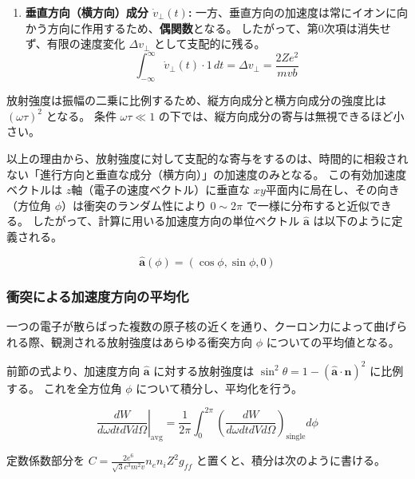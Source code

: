 \documentclass[a4paper,11pt]{bxjsarticle} %
\begin{document}
\begin{enumerate}
\begin{enumerate}
        \item \textbf{垂直方向（横方向）成分 $\dot{v}_{\perp}(t)$:} 
        一方、垂直方向の加速度は常にイオンに向かう方向に作用するため、\textbf{偶関数}となる。
        したがって、第0次項は消失せず、有限の速度変化 $\Delta v_{\perp}$ として支配的に残る。
        \begin{equation}
            \int_{-\infty}^{\infty} \dot{v}_{\perp}(t) \cdot 1 \, dt = \Delta v_{\perp} = \frac{2Ze^2}{mvb}
        \end{equation}
    \end{enumerate}

    放射強度は振幅の二乗に比例するため、縦方向成分と横方向成分の強度比は $(\omega \tau)^2$ となる。
    条件 $\omega \tau \ll 1$ の下では、縦方向成分の寄与は無視できるほど小さい。

    以上の理由から、放射強度に対して支配的な寄与をするのは、時間的に相殺されない「進行方向と垂直な成分（横方向）」の加速度のみとなる。
    この有効加速度ベクトルは $z$軸（電子の速度ベクトル）に垂直な $xy$平面内に局在し、その向き（方位角 $\phi$）は衝突のランダム性により $0 \sim 2\pi$ で一様に分布すると近似できる。
    したがって、計算に用いる加速度方向の単位ベクトル $\hat{\bm{a}}$ は以下のように定義される。

    \begin{equation}
        \hat{\bm{a}}(\phi) = (\cos\phi, \sin\phi, 0)
    \end{equation}
\end{enumerate}

\subsubsection{衝突による加速度方向の平均化}

一つの電子が散らばった複数の原子核の近くを通り、クーロン力によって曲げられる際、観測される放射強度はあらゆる衝突方向 $\phi$ についての平均値となる。

前節の式より、加速度方向 $\hat{\bm{a}}$ に対する放射強度は $\sin^2\theta = 1 - (\hat{\bm{a}} \cdot \bm{n})^2$ に比例する。
これを全方位角 $\phi$ について積分し、平均化を行う。

\begin{equation}
    \left. \frac{d W}{d\omega dt dV d\Omega} \right|_{\text{avg}} = \frac{1}{2\pi} \int_0^{2\pi} \left( \frac{d W}{d\omega dt dV d\Omega} \right)_{\text{single}} d\phi
\end{equation}

定数係数部分を $C = \frac{2 e^6}{\sqrt{3} c^3 m^2 v} n_e n_i Z^2 g_{ff}$ と置くと、積分は次のように書ける。
\end{document}
